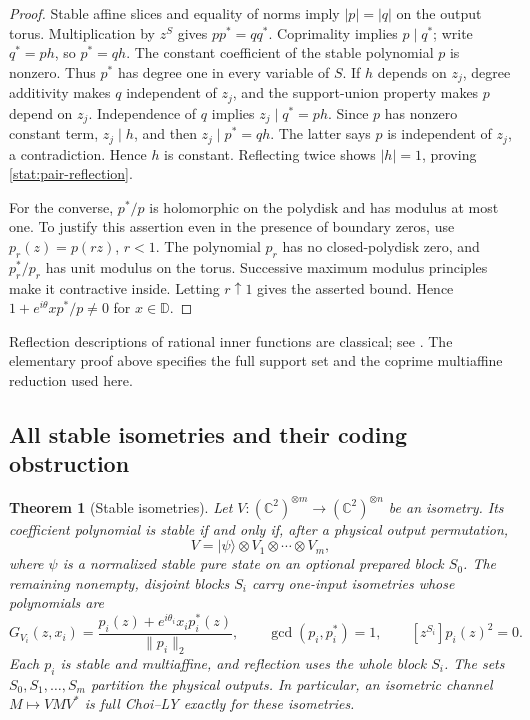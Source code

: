 \documentclass[reqno]{amsart}
\newtheorem{theorem}{Theorem}[section]
\theoremstyle{definition}
\theoremstyle{remark}
\newcommand{\C}{\mathbb C}
\newcommand{\D}{\mathbb D}
\begin{document}
\begin{proof}
Stable affine slices and equality of norms imply \(|p|=|q|\) on
the output torus.  Multiplication by \(z^S\) gives
\(pp^*=qq^*\).  Coprimality implies \(p\mid q^*\); write
\(q^*=ph\), so \(p^*=qh\).
The constant coefficient of the stable polynomial \(p\) is nonzero.
Thus \(p^*\) has degree one in every variable of \(S\).
If \(h\) depends on \(z_j\), degree additivity makes \(q\)
independent of \(z_j\), and the support-union property makes
\(p\) depend on \(z_j\).  Independence of \(q\) implies
\(z_j\mid q^*=ph\).  Since \(p\) has nonzero constant term,
\(z_j\mid h\), and then \(z_j\mid p^*=qh\).  The latter
says \(p\) is independent of \(z_j\), a contradiction.  Hence
\(h\) is constant.  Reflecting twice shows \(|h|=1\), proving
\eqref{stat:pair-reflection}.

For the converse, \(p^*/p\) is holomorphic on the polydisk and
has modulus at most one.  To justify this assertion even in the
presence of boundary zeros, use \(p_r(z)=p(rz)\), \(r<1\).
The polynomial \(p_r\) has no closed-polydisk zero, and
\(p_r^*/p_r\) has unit modulus on the torus.  Successive maximum
modulus principles make it contractive inside.  Letting \(r\uparrow1\)
gives the asserted bound.  Hence
\(1+e^{i\theta}x p^*/p\ne0\) for \(x\in\D\).
\end{proof}

Reflection descriptions of rational inner functions are classical;
see \cite{Knese24}.  The elementary proof above specifies
the full support set and the coprime multiaffine reduction used here.

\subsection{All stable isometries and their coding obstruction}

\begin{theorem}[Stable isometries]
\label{stat:isometry}
Let \(V:(\C^2)^{\otimes m}\to(\C^2)^{\otimes n}\) be an
isometry.  Its coefficient polynomial is stable if and only if,
after a physical output permutation,
\begin{equation}
 V=|\psi\rangle\otimes V_1\otimes\cdots\otimes V_m,
 \label{stat:isometry-form}
\end{equation}
where \(\psi\) is a normalized stable pure state on an optional
prepared block \(S_0\).  The remaining nonempty, disjoint blocks
\(S_i\) carry one-input isometries whose polynomials are
\begin{equation}
 G_{V_i}(z,x_i)=
 \frac{p_i(z)+e^{i\theta_i}x_i p_i^*(z)}{\|p_i\|_2},
 \qquad \gcd(p_i,p_i^*)=1,
 \qquad [z^{S_i}]p_i(z)^2=0.
 \label{stat:isometry-block}
\end{equation}
Each \(p_i\) is stable and multiaffine, and reflection uses the
whole block \(S_i\).  The sets \(S_0,S_1,\ldots,S_m\) partition
the physical outputs.  In particular, an isometric channel
\(M\mapsto VMV^*\) is full Choi--LY exactly for these isometries.
\end{theorem}
\end{document}
